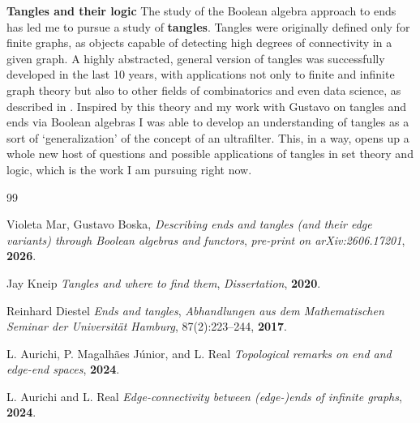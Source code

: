 \documentclass[11pt,a4paper]{article}
\begin{document}
\textbf{\large Tangles and their logic}
The study of the Boolean algebra approach to ends has led me to pursue a study of \textbf{tangles}. Tangles were originally defined only for finite graphs, as objects capable of detecting high degrees of connectivity in a given graph. A highly abstracted, general version of tangles was successfully developed in the last 10 years, with applications not only to finite and infinite graph theory but also to other fields of combinatorics and even data science, as described in \cite{jay}. Inspired by this theory and my work with Gustavo on tangles and ends via Boolean algebras I was able to develop an understanding of tangles as a sort of `generalization' of the concept of an ultrafilter. This, in a way, opens up a whole new host of questions and possible applications of tangles in set theory and logic, which is the work I am pursuing right now.



\begin{thebibliography}{99}

Violeta Mar, Gustavo Boska, \emph{Describing ends and tangles (and their edge variants) through Boolean algebras and functors}, \textit{pre-print on arXiv:2606.17201}, \textbf{2026}.

Jay Kneip \emph{Tangles and where to find them}, \textit{Dissertation}, \textbf{2020}. 

Reinhard Diestel \emph{Ends and tangles}, \textit{Abhandlungen aus dem Mathematischen Seminar der Universität Hamburg}, 87(2):223–244, \textbf{2017}.



L. Aurichi, P. Magalhães Júnior, and L. Real \emph{Topological remarks on end and edge-end spaces}, \textbf{2024}.

L. Aurichi and L. Real \emph{Edge-connectivity between (edge-)ends of infinite graphs}, \textbf{2024}.

\end{thebibliography}
\end{document}
